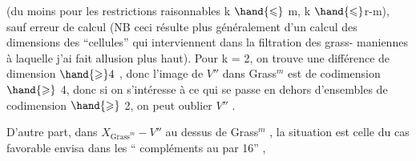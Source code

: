(du moins pour les restrictions raisonnables k $\hand{\leqslant}$ m, k $\hand{\leqslant}$r-m), sauf
erreur de calcul (NB ceci résulte plus généralement d'un calcul des
dimensions des ``cellules'' qui interviennent dans la filtration des grass-%
maniennes à laquelle j'ai fait allusion plus haut). Pour k = 2, on
trouve une différence de dimension $\hand{\geqslant} 4$ , donc l'image de $V''$ dans Grass$^m$
est de codimension $\hand{\geqslant}$ 4, donc si on s'intéresse à ce qui se passe en dehors
d'ensembles  de codimension $\hand{\geqslant}$ 2, on peut  oublier $V''$ .

D'autre part, dans $X_{\text{Grass}^m} - V''$ au dessus de Grass$^m$ , la situation
est celle du cas favorable envisa dans les `` compléments au par 16'' ,

